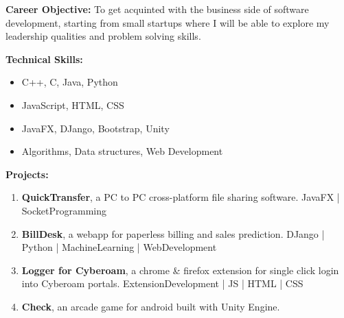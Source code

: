 \documentclass[11pt]{article}
\begin{document}
\begin{center}
		\begin{minipage}[t]{0.3\textwidth}
			\raggedright\smallskip
			\begin{LARGE}
				\textbf{Career Objective:}\medskip\linebreak%
				{\small To get acquinted with the business side of software development, starting from small startups where I will be able to explore my leadership qualities and problem solving skills.}\linebreak%
			\end{LARGE}
		\end{minipage}%
		\linebreak\linebreak\linebreak
		\begin{minipage}[t]{0.35\textwidth}
			\raggedright\smallskip
			\begin{LARGE}
				\textbf{Technical Skills:}\medskip%
				{\small
					\begin{itemize}
						\item C++, C, Java, Python
						\item JavaScript, HTML, CSS
						\item JavaFX, DJango, Bootstrap, Unity
						\item Algorithms, Data structures, Web Development
					\end{itemize}
				}
			\end{LARGE}
		\end{minipage}%
		\begin{minipage}[t]{0.65\textwidth}
			\raggedright\smallskip
			\begin{LARGE}
				\textbf{Projects:}\medskip%
				{\small
					\begin{enumerate}
						\item \textbf{QuickTransfer}, a PC to PC cross-platform file sharing software.\linebreak
						JavaFX | SocketProgramming
						\item \textbf{BillDesk}, a webapp for paperless billing and sales prediction.
						DJango | Python | MachineLearning | WebDevelopment
						\item \textbf{Logger for Cyberoam}, a chrome \& firefox extension for single click login into Cyberoam portals.\linebreak
						ExtensionDevelopment | JS | HTML | CSS
						\item \textbf{Check}, an arcade game for android built with Unity Engine.\linebreak

\end{enumerate}}
\end{LARGE}
\end{minipage}
\end{center}
\end{document}
